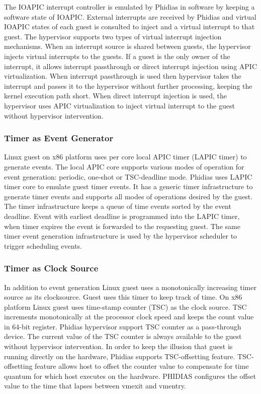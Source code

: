 The IOAPIC interrupt controller is emulated by Phidias in software by keeping a software state of IOAPIC. 
External interrupts are received by Phidias and virtual IOAPIC states of each guest is consulted to inject and a virtual interrupt to that guest.
The hypervisor supports two types of virtual interrupt injection mechanisms.
When an interrupt source is shared between guests, the hypervisor injects virtual interrupts to the guests.
If a guest is the only owner of the interrupt, it allows interrupt passthrough or direct interrupt injection using APIC virtualization.
When interrupt passthrough is used then hypervisor takes the interrupt and passes it to the hypervisor without further processing, keeping the kernel execution path short. 
When direct interrupt injection is used, the hypervisor uses APIC virtualization to inject virtual interrupt to the guest without hypervisor intervention.

\subsubsection{Timer as Event Generator}
Linux guest on x86 platform uses per core local APIC timer (LAPIC timer) to generate events. 
The local APIC core supports various modes of operation for event generation: periodic, one-shot or TSC-deadline mode. 
Phidias uses LAPIC timer core to emulate guest timer events.
It has a generic timer infrastructure to generate timer events and supports all modes of operations desired by the guest. 
The timer infrastructure keeps a queue of time events sorted by the event deadline.
Event with earliest deadline is programmed into the LAPIC timer, when timer expires the event is forwarded to the requesting guest.
The same timer event generation infrastructure is used by the hypervisor scheduler to trigger scheduling events.

\subsubsection{Timer as Clock Source}
In addition to event generation Linux guest uses a monotonically increasing timer source as its clocksource. 
Guest uses this timer to keep track of time. 
On x86 platform Linux guest uses time-stamp counter (TSC) as the clock source. 
TSC increments monotonically at the processor clock speed and keeps the count value in 64-bit register.
Phidias hypervisor support TSC counter as a pass-through device.
The current value of the TSC counter is always available to the guest without hypervisor intervention.
In order to keep the illusion that guest is running directly on the hardware, Phidias supports TSC-offsetting feature.
TSC-offsetting feature allows host to offset the counter value to compensate for time quantum for which host executes on the hardware.
PHIDIAS configures the offset value to the time that lapses between vmexit and vmentry.

